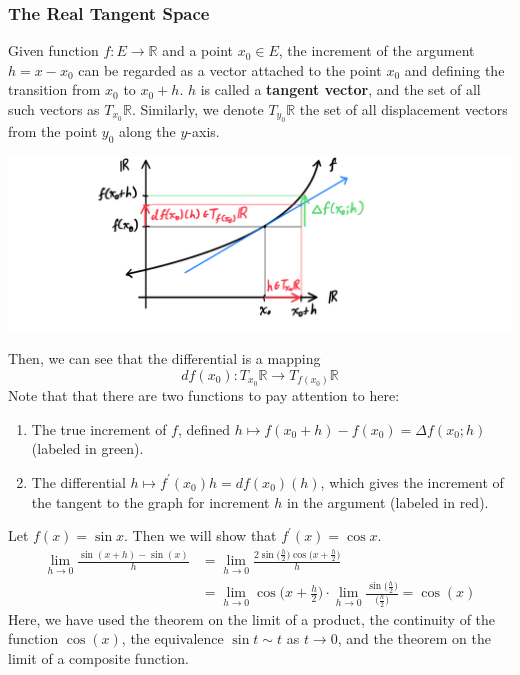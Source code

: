 \documentclass{article}
\begin{document}
    \subsubsection{The Real Tangent Space}

    \begin{definition}
      Given function $f: E \longrightarrow \mathbb{R}$ and a point $x_0 \in E$, the increment of the argument $h = x - x_0$ can be regarded as a vector attached to the point $x_0$ and defining the transition from $x_0$ to $x_0 + h$. $h$ is called a \textbf{tangent vector}, and the set of all such vectors as $T_{x_0} \mathbb{R}$. Similarly, we denote $T_{y_0} \mathbb{R}$ the set of all displacement vectors from the point $y_0$ along the $y$-axis. 
      \begin{center}
          \includegraphics[scale=0.25]{img/Tangent_Space_1_dimensional_in_R.PNG}
      \end{center}
      Then, we can see that the differential is a mapping
      \[df(x_0): T_{x_0} \mathbb{R} \longrightarrow T_{f(x_0)} \mathbb{R}\]
      Note that that there are two functions to pay attention to here: 
      \begin{enumerate}
        \item The true increment of $f$, defined $h \mapsto f(x_0 + h) - f(x_0) = \Delta f(x_0; h)$ (labeled in green). 
        \item The differential $h \mapsto f^\prime (x_0) h = df(x_0) (h)$, which gives the increment of the tangent to the graph for increment $h$ in the argument (labeled in red). 
      \end{enumerate}
    \end{definition}

    \begin{example}
      Let $f(x) = \sin{x}$. Then we will show that $f^\prime (x) = \cos{x}$. 
      \begin{align*}
          \lim_{h \rightarrow 0} \frac{\sin{(x+h)} - \sin(x)}{h} & = \lim_{h \rightarrow 0} \frac{2 \sin \big( \frac{h}{2} \big) \cos \big( x + \frac{h}{2} \big)}{h} \\
          & = \lim_{h \rightarrow 0} \cos \Big( x + \frac{h}{2} \Big) \cdot \lim_{h\rightarrow 0} \frac{\sin\big( \frac{h}{2}\big)}{\big(\frac{h}{2}\big)} = \cos(x)
      \end{align*}
      Here, we have used the theorem on the limit of a product, the continuity of the function $\cos(x)$, the equivalence $\sin{t} \sim t$ as $t \rightarrow 0$, and the theorem on the limit of a composite function. 
    \end{example}
\end{document}
